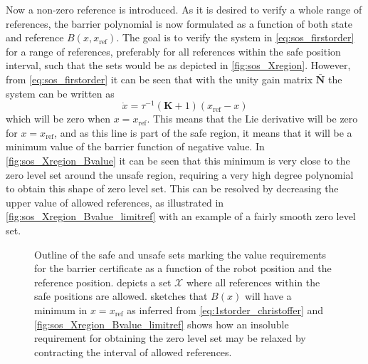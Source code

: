 Now a non-zero reference is introduced. As it is desired to verify a whole range of references, the barrier polynomial is now formulated as a function of both state and reference $B(x,x_\text{ref})$.
The goal is to verify the system in \autoref{eq:sos_firstorder} for a range of references, preferably for all references within the safe position interval, such that the sets would be as depicted in \autoref{fig:sos_Xregion}.
However, from \autoref{eq:sos_firstorder} it can be seen that with the unity gain matrix $\bar{\mathbf{N}}$ the system can be  written as
\begin{equation}
\dot{x} = \tau^{-1}(\mathbf{K}+1)(x_\text{ref}-x)\label{eq:1storder_christoffer}
\end{equation}
which will be zero when $x=x_\text{ref}$. This means that the Lie derivative will be zero for $x=x_\text{ref}$, and as this line is part of the safe region, it means that it will be a minimum value of the barrier function of negative value. In \autoref{fig:sos_Xregion_Bvalue} it can be seen that this minimum is very close to the zero level set around the unsafe region, requiring a very high degree polynomial to obtain this shape of zero level set. This can be resolved by decreasing the upper value of allowed references, as illustrated in \autoref{fig:sos_Xregion_Bvalue_limitref} with an example of a fairly smooth zero level set.

\begin{figure}[htbp]
\centering
{}%
\hspace{3mm}
%
\hspace{3mm}
%
\caption{Outline of the safe and unsafe sets marking the value requirements for the barrier certificate as a function of the robot position and the reference position.  depicts a set $\mathcal{X}$ where all references within the safe positions are allowed.  sketches that $B(x)$ will have a minimum in $x=x_\text{ref}$ as inferred from \autoref{eq:1storder_christoffer} and \autoref{fig:sos_Xregion_Bvalue_limitref} shows how an insoluble requirement for obtaining the zero level set may be relaxed by contracting the interval of allowed references.}
\label{fig:sets_reference}
\end{figure}

